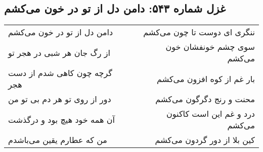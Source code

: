 \begin{center}
\section*{غزل شماره ۵۴۳: دامن دل از تو در خون می‌کشم}
\label{sec:543}
\begin{longtable}{l p{0.5cm} r}
دامن دل از تو در خون می‌کشم
&&
ننگری ای دوست تا چون می‌کشم
\\
از رگ جان هر شبی در هجر تو
&&
سوی چشم خونفشان خون می‌کشم
\\
گرچه چون کاهی شدم از دست هجر
&&
بار غم از کوه افزون می‌کشم
\\
دور از روی تو هر دم بی تو من
&&
محنت و رنج دگرگون می‌کشم
\\
آن همه خود هیچ بود و درگذشت
&&
درد و غم این است کاکنون می‌کشم
\\
من که عطارم یقین می‌باشدم
&&
کین بلا از دور گردون می‌کشم
\\
\end{longtable}
\end{center}
